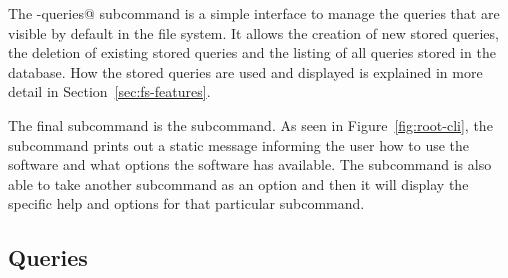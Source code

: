 The \verb@stored-queries@ subcommand is a simple interface to manage the
queries that are visible by default in the file system. It allows the creation
of new stored queries, the deletion of existing stored queries and the listing
of all queries stored in the database. How the stored queries are used and
displayed is explained in more detail in Section~\ref{sec:fs-features}.

The final subcommand is the \verb@help@ subcommand. As seen in
Figure~\ref{fig:root-cli}, the \verb@help@ subcommand prints out a static
message informing the user how to use the software and what options the
software has available. The \verb@help@ subcommand is also able to take another
subcommand as an option and then it will display the specific help and options
for that particular subcommand.

\subsection{Queries}
\label{sec:queries}

